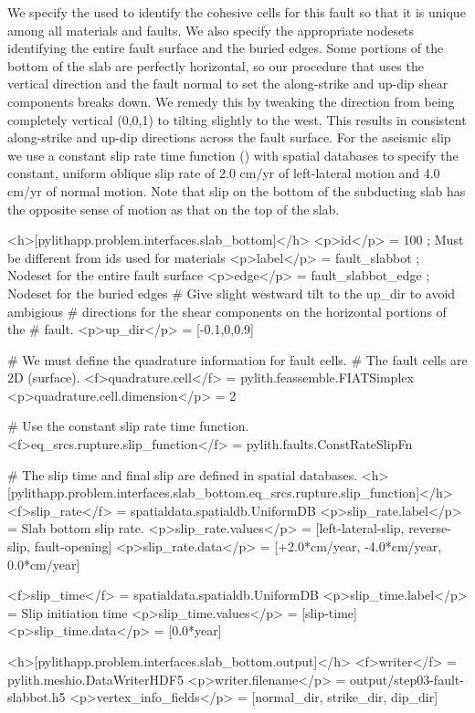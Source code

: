 We specify the  used to identify the cohesive cells for
this fault so that it is unique among all materials and faults. We
also specify the appropriate nodesets identifying the entire fault
surface and the buried edges.  Some portions of the bottom of the slab
are perfectly horizontal, so our procedure that uses the vertical
direction and the fault normal to set the along-strike and up-dip
shear components breaks down. We remedy this by tweaking the
 direction from being completely vertical (0,0,1) to
tilting slightly to the west. This results in consistent along-strike
and up-dip directions across the fault surface. For the aseismic slip
we use a constant slip rate time function ()
with  spatial databases to specify the constant,
uniform oblique slip rate of 2.0 cm/yr of left-lateral motion and 4.0
cm/yr of normal motion. Note that slip on the bottom of the subducting
slab has the opposite sense of motion as that on the top of the slab.
\begin{cfg}
<h>[pylithapp.problem.interfaces.slab_bottom]</h>
<p>id</p> = 100 ; Must be different from ids used for materials
<p>label</p> = fault_slabbot ; Nodeset for the entire fault surface
<p>edge</p> = fault_slabbot_edge ; Nodeset for the buried edges
# Give slight westward tilt to the up_dir to avoid ambigious
# directions for the shear components on the horizontal portions of the
# fault.
<p>up_dir</p> = [-0.1,0,0.9]

# We must define the quadrature information for fault cells.
# The fault cells are 2D (surface).
<f>quadrature.cell</f> = pylith.feassemble.FIATSimplex
<p>quadrature.cell.dimension</p> = 2

# Use the constant slip rate time function.
<f>eq_srcs.rupture.slip_function</f> = pylith.faults.ConstRateSlipFn

# The slip time and final slip are defined in spatial databases.
<h>[pylithapp.problem.interfaces.slab_bottom.eq_srcs.rupture.slip_function]</h>
<f>slip_rate</f> = spatialdata.spatialdb.UniformDB
<p>slip_rate.label</p> = Slab bottom slip rate.
<p>slip_rate.values</p> = [left-lateral-slip, reverse-slip, fault-opening]
<p>slip_rate.data</p> = [+2.0*cm/year, -4.0*cm/year, 0.0*cm/year]

<f>slip_time</f> = spatialdata.spatialdb.UniformDB
<p>slip_time.label</p>  = Slip initiation time
<p>slip_time.values</p> = [slip-time]
<p>slip_time.data</p> = [0.0*year] 

<h>[pylithapp.problem.interfaces.slab_bottom.output]</h>
<f>writer</f> = pylith.meshio.DataWriterHDF5
<p>writer.filename</p> = output/step03-fault-slabbot.h5
<p>vertex_info_fields</p> = [normal_dir, strike_dir, dip_dir]
\end{cfg}

